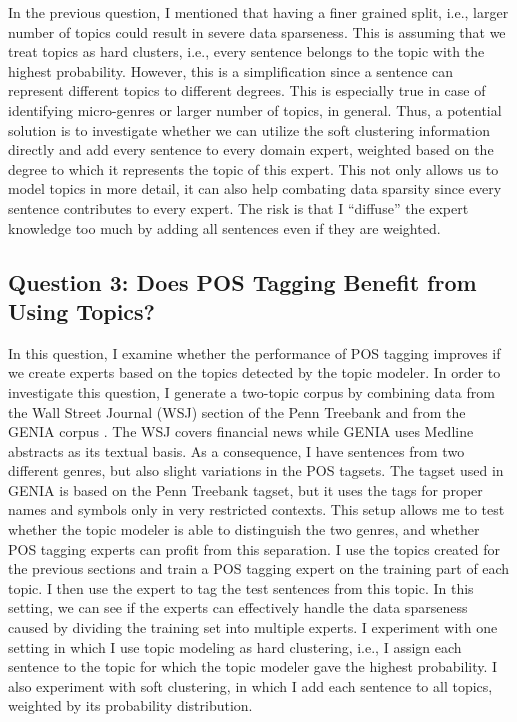 In the previous question, I mentioned that having a finer grained split, i.e., larger number of topics could result in severe data sparseness. This is assuming that we treat topics as hard clusters, i.e., every sentence belongs to the topic with the highest probability. However, this is a simplification since a sentence can represent different topics to different degrees. This is especially true in case of identifying micro-genres or larger number of topics, in general. Thus, a potential solution is to investigate whether we can utilize the soft clustering information directly and add every sentence to every domain expert, weighted based on the degree to which it represents the topic of this expert. This not only allows us to model topics in more detail, it can also help combating data sparsity since every sentence contributes to every expert. The risk is that I ``diffuse'' the expert knowledge too much by adding all sentences even if they are weighted. 

\subsection*{Question 3: Does POS Tagging Benefit from Using Topics?}

In this question, I examine whether the performance of POS tagging improves if we create experts based on the topics detected by the topic modeler. 
In order to investigate this question, I generate a two-topic corpus by combining data from the Wall Street Journal (WSJ) section of the Penn Treebank \cite{marcus:kim:ea:94} and from the GENIA corpus \cite{tateisi:tsujii:04}. The WSJ covers financial news while GENIA uses Medline abstracts as its textual basis. As a consequence, I have sentences from two different genres, but also slight variations in the POS tagsets. The tagset used in GENIA is based on the Penn Treebank tagset, but it uses the tags for proper names and symbols only in very restricted contexts. This setup allows me to test whether the topic modeler is able to distinguish the two genres, and whether POS tagging experts can profit from this separation. I use the topics created for the previous sections and train a POS tagging expert on the training part of each topic. I then use the expert to tag the test sentences from this topic. In this setting, we can see  if the experts can effectively handle the data sparseness caused by dividing the training set into multiple experts. I experiment with one setting in which I use topic modeling as hard clustering, i.e., I assign each sentence to the topic for which the topic modeler gave the highest probability. I also experiment with soft clustering, in which I add each sentence to all topics, weighted by its probability distribution.

